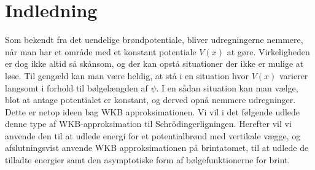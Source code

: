 \section{Indledning}


Som bekendt fra det uendelige brøndpotentiale, bliver udregningerne nemmere, når man har et område med et konstant potentiale $V(x)$ at gøre. Virkeligheden er dog ikke altid så skånsom, og der kan opstå situationer der ikke er mulige at løse. Til gengæld kan man være heldig, at stå i en situation hvor $V(x)$ varierer langsomt i forhold til bølgelængden af $\psi$. I en sådan situation kan man vælge, blot at antage potentialet er konstant, og derved opnå nemmere udregninger. Dette er netop ideen bag WKB approksimationen.
Vi vil i det følgende udlede denne type af WKB-approksimation til Schrödingerligningen. Herefter vil vi anvende den til at udlede energi for et potentialbrønd med vertikale vægge, og afslutningsvist anvende WKB approksimationen på brintatomet, til at udlede de tilladte energier samt den asymptotiske form af bølgefunktionerne for brint.
